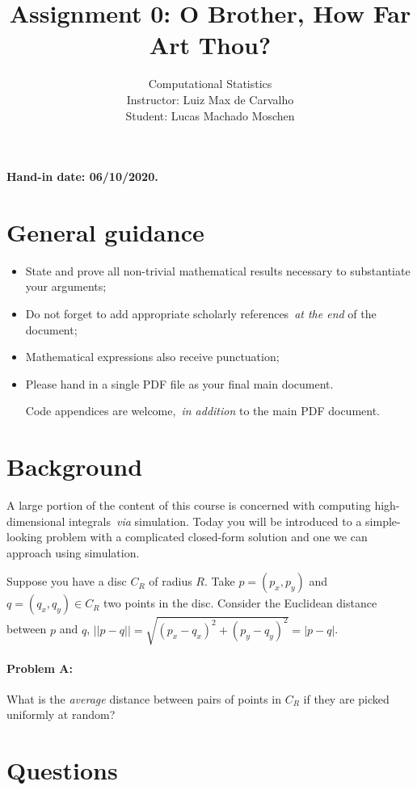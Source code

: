 \documentclass[a4paper,10pt, notitlepage]{report}
\title{Assignment 0: O Brother, How Far Art Thou?}
\author{Computational Statistics \\ Instructor: Luiz Max de Carvalho \\ Student: Lucas Machado Moschen}
\begin{document}
\maketitle

\textbf{Hand-in date: 06/10/2020.}

\section*{General guidance}
\begin{itemize}
 \item State and prove all non-trivial mathematical results necessary to substantiate your arguments;
 \item Do not forget to add appropriate scholarly references~\textit{at the end} of the document;
 \item Mathematical expressions also receive punctuation;
 \item Please hand in a single PDF file as your final main document.
 
 Code appendices are welcome,~\textit{in addition} to the main PDF document.
 \end{itemize}

\newpage

\section*{Background}

A large portion of the content of this course is concerned with computing high-dimensional integrals~\textit{via} simulation.
Today you will be introduced to a simple-looking problem with a complicated closed-form solution and one we can approach using simulation.

Suppose you have a disc $C_R$ of radius $R$. 
Take $p = (p_x, p_y)$ and $ q = (q_x, q_y) \in C_R$ two points in the disc.  
Consider the Euclidean distance between $p$  and $q$, $||p-q|| = \sqrt{(p_x-q_x)^2 + (p_y-q_y)^2} = |p-q|$.
\paragraph{Problem A:} What is the \textit{average} distance between pairs of points in $C_R$ if they are picked uniformly at random?

\section*{Questions}
\end{document}
